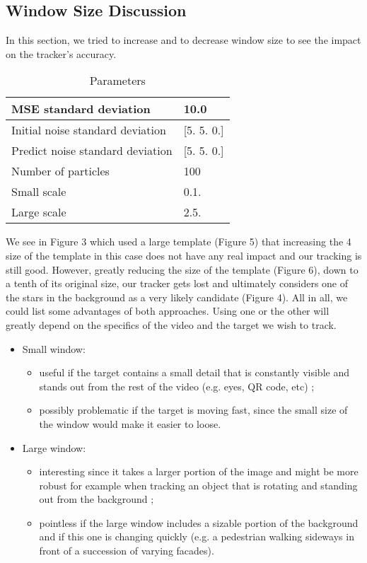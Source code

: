 \documentclass[a4paper,11pt]{article}
\begin{document}
\subsection{Window Size Discussion}

In this section, we tried to increase and to decrease window size to see the impact on the tracker's accuracy.

\begin{table}[H]
\centering
\caption{Parameters}
\begin{tabular}{|l|l|}
\hline
MSE standard deviation           & 10.0           \\ \hline
Initial noise standard deviation & {[}5. 5. 0.{]} \\ \hline
Predict noise standard deviation & {[}5. 5. 0.{]} \\ \hline
Number of particles              & 100            \\ \hline
Small scale                          &  0.1.           \\ \hline
Large scale                          &  2.5.          \\ \hline

\end{tabular}
\end{table}


We see in Figure 3 which used a large template (Figure 5) that increasing the 4
size of the template in this case does not have any real impact and our tracking is still good.
However, greatly reducing the size of the template (Figure 6), down to a tenth of its original size, our tracker gets lost and ultimately considers one of the stars in the background as a very likely candidate (Figure 4).
All in all, we could list some advantages of both approaches. Using one or the other will greatly depend on the specifics of the video and the target we wish to track.
\begin{itemize}
\item Small window: 
\begin{itemize}
	\item useful if the target contains a small detail that is constantly visible
and stands out from the rest of the video (e.g. eyes, QR code, etc) ; 
	\item possibly problematic if the target is moving fast, since the small size
of the window would make it easier to loose. 
\end{itemize}
\item Large window:
\begin{itemize}
        \item interesting since it takes a larger portion of the image and might be more robust for example when tracking an object that is rotating and standing out from the background ;
	\item pointless if the large window includes a sizable portion of the background and if this one is changing quickly (e.g. a pedestrian walking sideways in front of a succession of varying facades).
\end{itemize}
\end{itemize}
\end{document}
